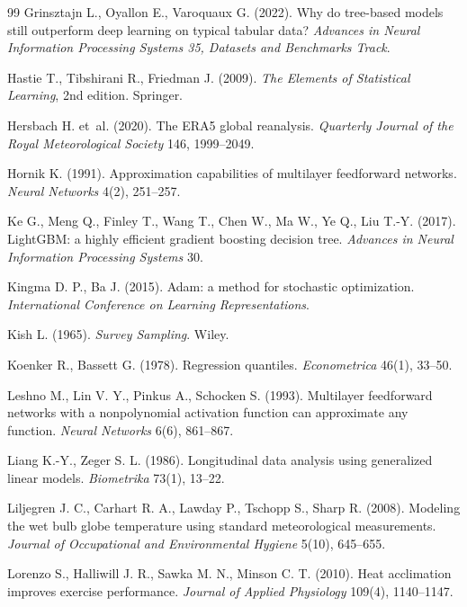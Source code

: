 \documentclass[11pt,a4paper]{article}
\begin{document}
\begin{thebibliography}{99}
Grinsztajn L., Oyallon E., Varoquaux G. (2022). Why do tree-based models still outperform deep learning on typical
tabular data? \emph{Advances in Neural Information Processing Systems 35, Datasets and Benchmarks Track}.

Hastie T., Tibshirani R., Friedman J. (2009). \emph{The Elements of Statistical Learning}, 2nd edition. Springer.

Hersbach H. et~al. (2020). The ERA5 global reanalysis. \emph{Quarterly Journal of the Royal Meteorological Society}
146, 1999--2049.

Hornik K. (1991). Approximation capabilities of multilayer feedforward networks. \emph{Neural Networks} 4(2),
251--257.

Ke G., Meng Q., Finley T., Wang T., Chen W., Ma W., Ye Q., Liu T.-Y. (2017). LightGBM: a highly efficient gradient
boosting decision tree. \emph{Advances in Neural Information Processing Systems} 30.

Kingma D. P., Ba J. (2015). Adam: a method for stochastic optimization. \emph{International Conference on Learning
Representations}.

Kish L. (1965). \emph{Survey Sampling}. Wiley.

Koenker R., Bassett G. (1978). Regression quantiles. \emph{Econometrica} 46(1), 33--50.

Leshno M., Lin V. Y., Pinkus A., Schocken S. (1993). Multilayer feedforward networks with a nonpolynomial activation
function can approximate any function. \emph{Neural Networks} 6(6), 861--867.

Liang K.-Y., Zeger S. L. (1986). Longitudinal data analysis using generalized linear models. \emph{Biometrika} 73(1),
13--22.

Liljegren J. C., Carhart R. A., Lawday P., Tschopp S., Sharp R. (2008). Modeling the wet bulb globe temperature using
standard meteorological measurements. \emph{Journal of Occupational and Environmental Hygiene} 5(10), 645--655.

Lorenzo S., Halliwill J. R., Sawka M. N., Minson C. T. (2010). Heat acclimation improves exercise performance.
\emph{Journal of Applied Physiology} 109(4), 1140--1147.


\end{thebibliography}
\end{document}
